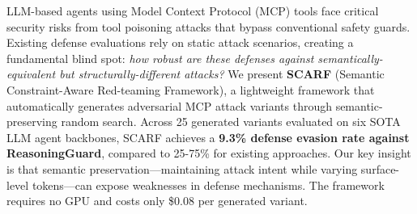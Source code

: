 LLM-based agents using Model Context Protocol (MCP) tools face critical security risks from tool poisoning attacks that bypass conventional safety guards. 
Existing defense evaluations rely on static attack scenarios, creating a fundamental blind spot: \textit{how robust are these defenses against semantically-equivalent but structurally-different attacks?} 
We present \textbf{SCARF} (Semantic Constraint-Aware Red-teaming Framework), a lightweight framework that automatically generates adversarial MCP attack variants through semantic-preserving random search. 
Across 25 generated variants evaluated on six SOTA LLM agent backbones, SCARF achieves a \textbf{9.3\% defense evasion rate against ReasoningGuard}, compared to 25-75\% for existing approaches. 
Our key insight is that semantic preservation---maintaining attack intent while varying surface-level tokens---can expose weaknesses in defense mechanisms. 
The framework requires no GPU and costs only \$0.08 per generated variant.